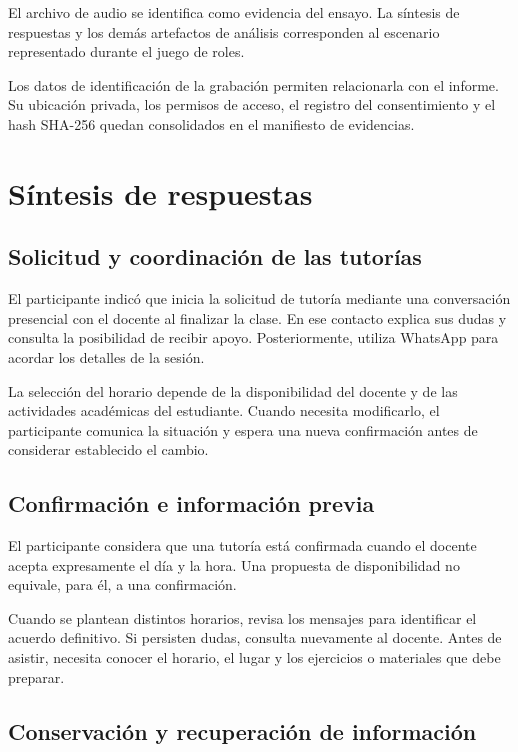 \documentclass[11pt,a4paper]{article}
\begin{document}
El archivo de audio se identifica como evidencia
del ensayo. La síntesis de respuestas y los demás
artefactos de análisis corresponden al escenario
representado durante el juego de roles.

Los datos de identificación de la grabación permiten
relacionarla con el informe. Su ubicación privada,
los permisos de acceso, el registro del consentimiento
y el hash SHA-256 quedan consolidados en el manifiesto
de evidencias.

\section{Síntesis de respuestas}

\subsection{Solicitud y coordinación de las tutorías}

El participante indicó que inicia la solicitud de tutoría
mediante una conversación presencial con el docente al
finalizar la clase. En ese contacto explica sus dudas
y consulta la posibilidad de recibir apoyo. Posteriormente,
utiliza WhatsApp para acordar los detalles de la sesión.

La selección del horario depende de la disponibilidad del
docente y de las actividades académicas del estudiante.
Cuando necesita modificarlo, el participante comunica
la situación y espera una nueva confirmación antes de
considerar establecido el cambio.

\subsection{Confirmación e información previa}

El participante considera que una tutoría está confirmada
cuando el docente acepta expresamente el día y la hora.
Una propuesta de disponibilidad no equivale, para él,
a una confirmación.

Cuando se plantean distintos horarios, revisa los mensajes
para identificar el acuerdo definitivo. Si persisten dudas,
consulta nuevamente al docente. Antes de asistir, necesita
conocer el horario, el lugar y los ejercicios o materiales
que debe preparar.

\subsection{Conservación y recuperación de información}
\end{document}
